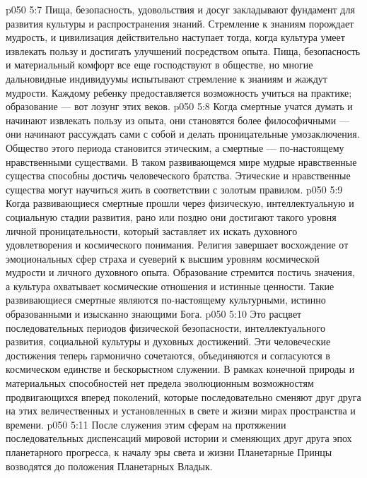 \vs p050 5:7 \bibnobreakspace {} Пища, безопасность, удовольствия и досуг закладывают фундамент для развития культуры и распространения знаний. Стремление к знаниям порождает мудрость, и цивилизация действительно наступает тогда, когда культура умеет извлекать пользу и достигать улучшений посредством опыта. Пища, безопасность и материальный комфорт все еще господствуют в обществе, но многие дальновидные индивидуумы испытывают стремление к знаниям и жаждут мудрости. Каждому ребенку предоставляется возможность учиться на практике; образование --- вот лозунг этих веков.
\vs p050 5:8 \bibnobreakspace {} Когда смертные учатся думать и начинают извлекать пользу из опыта, они становятся более философичными --- они начинают рассуждать сами с собой и делать проницательные умозаключения. Общество этого периода становится этическим, а смертные --- по\hyp{}настоящему нравственными существами. В таком развивающемся мире мудрые нравственные существа способны достичь человеческого братства. Этические и нравственные существа могут научиться жить в соответствии с золотым правилом.
\vs p050 5:9 \bibnobreakspace {} Когда развивающиеся смертные прошли через физическую, интеллектуальную и социальную стадии развития, рано или поздно они достигают такого уровня личной проницательности, который заставляет их искать духовного удовлетворения и космического понимания. Религия завершает восхождение от эмоциональных сфер страха и суеверий к высшим уровням космической мудрости и личного духовного опыта. Образование стремится постичь значения, а культура охватывает космические отношения и истинные ценности. Такие развивающиеся смертные являются по\hyp{}настоящему культурными, истинно образованными и изысканно знающими Бога.
\vs p050 5:10 \bibnobreakspace {} Это расцвет последовательных периодов физической безопасности, интеллектуального развития, социальной культуры и духовных достижений. Эти человеческие достижения теперь гармонично сочетаются, объединяются и согласуются в космическом единстве и бескорыстном служении. В рамках конечной природы и материальных способностей нет предела эволюционным возможностям продвигающихся вперед поколений, которые последовательно сменяют друг друга на этих величественных и установленных в свете и жизни мирах пространства и времени.
\vs p050 5:11 \pc После служения этим сферам на протяжении последовательных диспенсаций мировой истории и сменяющих друг друга эпох планетарного прогресса, к началу эры света и жизни Планетарные Принцы возводятся до положения Планетарных Владык.
